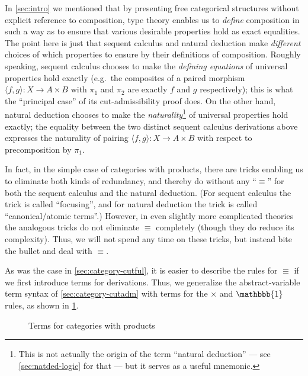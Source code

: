 \documentclass{book}
\def\idfunc{\mathsf{id}}
\let\types\vdash
\def\type{\;\ftype}
\def\unit{\mathbbb{1}}%
\def\ttt{\mathord{\ast}}%
\def\timesE{\ensuremath{\mathord{\times}E}}
\def\timesI{\ensuremath{\mathord{\times}I}}
\def\pair#1#2{\langle #1,#2\rangle}
\def\pr#1#2#3{\pi_{#1}^{#2,#3}}
\begin{document}
\begin{rmk}
  In \cref{sec:intro} we mentioned that by presenting free categorical structures without explicit reference to composition, type theory enables us to \emph{define} composition in such a way as to ensure that various desirable properties hold as exact equalities.
  The point here is just that sequent calculus and natural deduction make \emph{different} choices of which properties to ensure by their definitions of composition.
  Roughly speaking, sequent calculus chooses to make the \emph{defining equations} of universal properties hold exactly (e.g.\ the composites of a paired morphism $\pair f g : X \to A\times B$ with $\pi_1$ and $\pi_2$ are exactly $f$ and $g$ respectively); this is what the ``principal case'' of its cut-admissibility proof does.
  On the other hand, natural deduction chooses to make the \emph{naturality}\footnote{This is not actually the origin of the term ``natural deduction'' --- see \cref{sec:natded-logic} for that --- but it serves as a useful mnemonic.} of universal properties hold exactly; the equality between the two distinct sequent calculus derivations above expresses the naturality of pairing $\pair f g : X \to A\times B$ with respect to precomposition by $\pi_1$.
\end{rmk}

In fact, in the simple case of categories with products, there are tricks enabling us to eliminate {both} kinds of redundancy, and thereby do without any ``$\equiv$'' for both the sequent calculus and the natural deduction.
(For sequent calculus the trick is called ``focusing'', and for natural deduction the trick is called ``canonical/atomic terms''.)
However, in even slightly more complicated theories the analogous tricks do not eliminate $\equiv$ completely (though they do reduce its complexity).
Thus, we will not spend any time on these tricks, but instead bite the bullet and deal with $\equiv$.

As was the case in \cref{sec:category-cutful}, it is easier to describe the rules for $\equiv$ if we first introduce terms for derivations.
Thus, we generalize the abstract-variable term syntax of \cref{sec:category-cutadm} with terms for the $\times$ and $\unit$ rules, as shown in \cref{fig:catprod-terms}.

\begin{figure}
  \centering
  \caption{Terms for categories with products}
  \label{fig:catprod-terms}
\end{figure}
\end{document}
